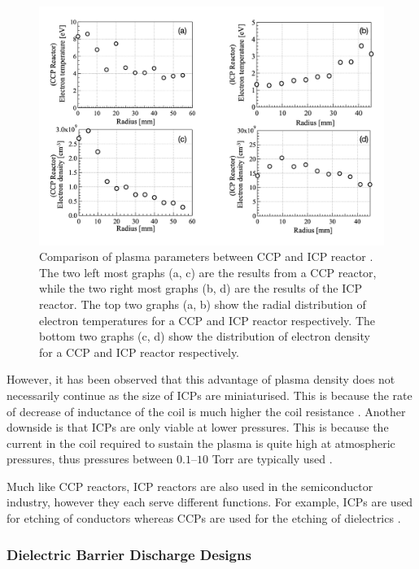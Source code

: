 \begin{figure}[h!]
	\centering
	\includegraphics[width=\linewidth]{chapter_2/figures/CCP_vs_ICP_reactor.png}
	\caption{Comparison of plasma parameters between CCP and ICP reactor \cite{Sakamoto2009ComparisonOP}. The two left most graphs (a, c) are the results from a CCP reactor, while the two right most graphs (b, d) are the results of the ICP reactor. The top two graphs (a, b) show the radial distribution of electron temperatures for a CCP and ICP reactor respectively. The bottom two graphs (c, d) show the distribution of electron density for a CCP and ICP reactor respectively.}
	\label{fig:CCP_vs_ICP}
\end{figure} 


However, it has been observed that this advantage of plasma density does not necessarily continue as the size of ICPs are miniaturised. This is because the rate of decrease of inductance of the coil is much higher the coil resistance \cite{Hopwood2000}. Another downside is that ICPs are only viable at lower pressures. This is because the current in the coil required to sustain the plasma is quite high at atmospheric pressures, thus pressures between $0.1–10$ Torr are typically used \cite{Hopwood2004}.

Much like CCP reactors, ICP reactors are also used in the semiconductor industry, however they each serve different functions. For example, ICPs are used for etching of conductors whereas CCPs are used for the etching of dielectrics \cite{Kruger2020}.


\subsubsection{Dielectric Barrier Discharge Designs}

